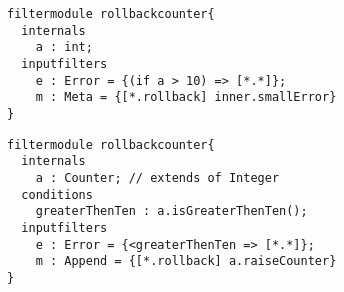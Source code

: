 \begin{lstlisting}[caption = {A filtermodule with a primitive}, label = lst::ARM:int:example3,
style = listing, language =ComposeStar, float = tpb]
filtermodule rollbackcounter{
  internals
    a : int;
  inputfilters
    e : Error = {(if a > 10) => [*.*]};
    m : Meta = {[*.rollback] inner.smallError}
}  
\end{lstlisting}

\begin{lstlisting}[caption = {A filtermodule with a primitive}, label = lst::ARM:int:example4,
style = listing, language =ComposeStar, float = tpb]
filtermodule rollbackcounter{
  internals
    a : Counter; // extends of Integer
  conditions
    greaterThenTen : a.isGreaterThenTen();
  inputfilters
    e : Error = {<greaterThenTen => [*.*]};
    m : Append = {[*.rollback] a.raiseCounter}
}
\end{lstlisting}
